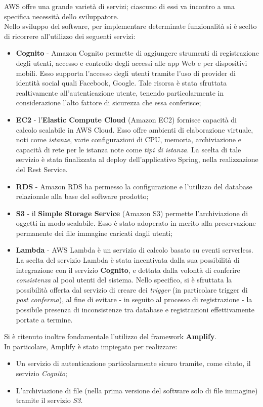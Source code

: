 \documentclass{natourDoc}
\begin{document}
AWS offre una grande varietà di servizi; ciascuno di essi va incontro a una specifica necessità dello sviluppatore. \\
Nello sviluppo del software, per implementare determinate funzionalità si è scelto di ricorrere all'utilizzo dei seguenti servizi:
\begin{itemize}
	\item \textbf{Cognito} - Amazon Cognito permette di aggiungere strumenti di registrazione degli utenti, accesso
	      e controllo degli accessi alle app Web e per dispositivi mobili. Esso supporta l'accesso degli utenti
	      tramite l'uso di provider di identità social quali Facebook, Google.
	      Tale risorsa è stata sfruttata realtivamente all'autenticazione utente, tenendo particolarmente in considerazione
	      l'alto fattore di sicurezza che essa conferisce;
	\item \textbf{EC2} - l'\textbf{Elastic Compute Cloud} (Amazon EC2) fornisce capacità di calcolo scalabile in AWS Cloud.
	      Esso offre ambienti di elaborazione virtuale, noti come \textit{istanze}, varie configurazioni di CPU, memoria,
	      archiviazione e capacità di rete per le istanza note come \textit{tipi di istanza}.
	      La scelta di tale servizio è stata finalizzata al deploy dell'applicativo Spring, nella realizzazione del Rest Service.
	\item \textbf{RDS} - Amazon RDS ha permesso la configurazione e l'utilizzo del database relazionale alla base del software prodotto;
	\item \textbf{S3} - il \textbf{Simple Storage Service} (Amazon S3) permette l'archiviazione di oggetti in modo scalabile.
	      Esso è stato adoperato in merito alla preservazione permanente dei file immagine caricati dagli utenti;
	\item \textbf{Lambda} - AWS Lambda è un servizio di calcolo basato su eventi serverless.
	      La scelta del servizio Lambda è stata incentivata dalla sua possibilità di integrazione con il servizio \textbf{Cognito}, e dettata
	      dalla volontà di conferire \textit{consistenza} al pool utenti del sistema.
	      Nello specifico, si è sfruttata la possibilità offerta dal servizio di creare dei \textit{trigger} (in particolare trigger di \textit{post conferma}), al fine di
	      evitare - in seguito al processo di registrazione - la possibile presenza di inconsistenze tra database e registrazioni effettivamente portate a termine.
\end{itemize}

Si è ritenuto inoltre fondamentale l'utilizzo del framework \textbf{Amplify}.\\
In particolare, Amplify è stato impiegato per realizzare:
\begin{itemize}
	\item Un servizio di autenticazione particolarmente sicuro tramite, come citato, il servizio \textit{Cognito};
	\item L'archiviazione di file (nella prima versione del software solo di file immagine) tramite il servizio \textit{S3}.
\end{itemize}
\end{document}

